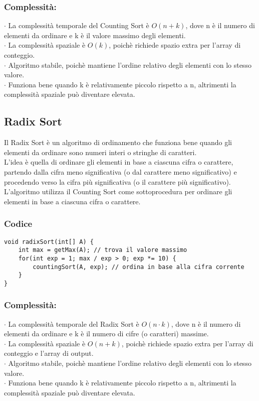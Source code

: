 \documentclass[a4paper,12pt]{article}
\begin{document}
\subsubsection*{\textcolor{teorema}{Complessità:}}
$\cdot $ La complessità temporale del Counting Sort è $O(n + k)$, dove n è il numero di elementi da ordinare e k è il valore massimo degli elementi. \\
$\cdot $ La complessità spaziale è $O(k)$, poichè richiede spazio extra per l'array di conteggio. \\
$\cdot $ Algoritmo stabile, poichè mantiene l'ordine relativo degli elementi con lo stesso valore. \\
$\cdot $ Funziona bene quando k è relativamente piccolo rispetto a n, altrimenti la complessità spaziale può diventare elevata. \\


\subsection{Radix Sort}
Il Radix Sort è un algoritmo di ordinamento che funziona bene quando gli elementi da ordinare sono numeri interi o stringhe di caratteri. \\
L'idea è quella di ordinare gli elementi in base a ciascuna cifra o carattere, partendo dalla cifra meno significativa (o dal carattere meno significativo) e procedendo verso la cifra più significativa (o il carattere più significativo). \\
L'algoritmo utilizza il Counting Sort come sottoprocedura per ordinare gli elementi in base a ciascuna cifra o carattere. \\


\subsubsection{\textcolor{codice}{Codice}}
\begin{lstlisting}[style=mystyle]
void radixSort(int[] A) {
    int max = getMax(A); // trova il valore massimo
    for(int exp = 1; max / exp > 0; exp *= 10) {
        countingSort(A, exp); // ordina in base alla cifra corrente
    }
}
\end{lstlisting}

\subsubsection*{\textcolor{teorema}{Complessità:}}
$\cdot $ La complessità temporale del Radix Sort è $O(n \cdot k)$, dove n è il numero di elementi da ordinare e k è il numero di cifre (o caratteri) massime. \\
$\cdot $ La complessità spaziale è $O(n + k)$, poichè richiede spazio extra per l'array di conteggio e l'array di output. \\
$\cdot $ Algoritmo stabile, poichè mantiene l'ordine relativo degli elementi con lo stesso valore. \\
$\cdot $ Funziona bene quando k è relativamente piccolo rispetto a n, altrimenti la complessità spaziale può diventare elevata. \\
\end{document}
